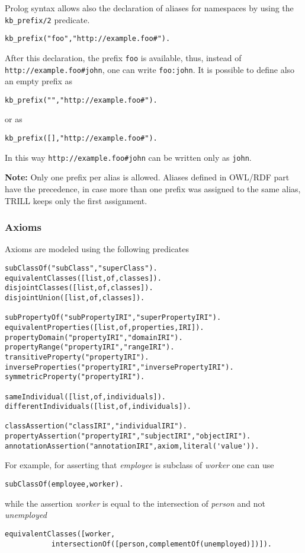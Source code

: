 Prolog syntax allows also the declaration of aliases for namespaces by using the \verb|kb_prefix/2| predicate.
\begin{verbatim}
kb_prefix("foo","http://example.foo#").
\end{verbatim}
After this declaration, the prefix \verb|foo| is available, thus, instead of \verb|http://example.foo#john|, one can write \verb|foo:john|.
It is possible to define also an empty prefix as
\begin{verbatim}
kb_prefix("","http://example.foo#").
\end{verbatim}
or as
\begin{verbatim}
kb_prefix([],"http://example.foo#").
\end{verbatim}
In this way \verb|http://example.foo#john| can be written only as \verb|john|.

\textbf{Note:} Only one prefix per alias is allowed. Aliases defined in OWL/RDF part have the precedence, in case more than one prefix was assigned to the same alias, TRILL keeps only the first assignment.


\subsubsection{Axioms}


Axioms are modeled using the following predicates
\begin{verbatim}
subClassOf("subClass","superClass").
equivalentClasses([list,of,classes]).
disjointClasses([list,of,classes]).
disjointUnion([list,of,classes]).

subPropertyOf("subPropertyIRI","superPropertyIRI").
equivalentProperties([list,of,properties,IRI]).
propertyDomain("propertyIRI","domainIRI").
propertyRange("propertyIRI","rangeIRI").
transitiveProperty("propertyIRI").
inverseProperties("propertyIRI","inversePropertyIRI").
symmetricProperty("propertyIRI").

sameIndividual([list,of,individuals]).
differentIndividuals([list,of,individuals]).

classAssertion("classIRI","individualIRI").
propertyAssertion("propertyIRI","subjectIRI","objectIRI").
annotationAssertion("annotationIRI",axiom,literal('value')).
\end{verbatim}
For example, for asserting that \textit{employee} is subclass of \textit{worker} one can use
\begin{verbatim}
subClassOf(employee,worker).
\end{verbatim}
while the assertion \textit{worker} is equal to the intersection of \textit{person} and not \textit{unemployed}
\begin{verbatim}
equivalentClasses([worker,
           intersectionOf([person,complementOf(unemployed)])]).
\end{verbatim}


